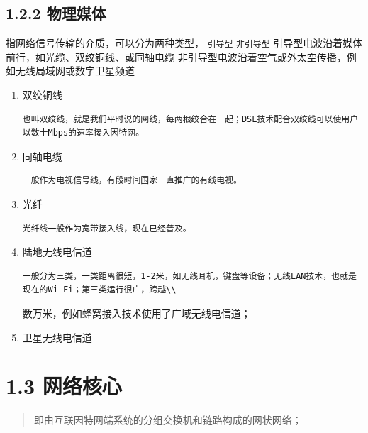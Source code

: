 \documentclass[11pt]{article}
\begin{document}
\subsection{1.2.2 物理媒体}
\label{sec:orgc332708}
指网络信号传输的介质，可以分为两种类型， \texttt{引导型}  \texttt{非引导型}
引导型电波沿着媒体前行，如光缆、双绞铜线、或同轴电缆
非引导型电波沿着空气或外太空传播，例如无线局域网或数字卫星频道
\begin{enumerate}
\item 双绞铜线
\begin{verbatim}
也叫双绞线，就是我们平时说的网线，每两根绞合在一起；DSL技术配合双绞线可以使用户以数十Mbps的速率接入因特网。
\end{verbatim}
\item 同轴电缆
\begin{verbatim}
一般作为电视信号线，有段时间国家一直推广的有线电视。
\end{verbatim}
\item 光纤
\begin{verbatim}
光纤线一般作为宽带接入线，现在已经普及。
\end{verbatim}
\item 陆地无线电信道
\begin{verbatim}
一般分为三类，一类距离很短，1-2米，如无线耳机，键盘等设备；无线LAN技术，也就是现在的Wi-Fi；第三类运行很广，跨越\\
\end{verbatim}

数万米，例如蜂窝接入技术使用了广域无线电信道；
\item 卫星无线电信道
\end{enumerate}


\section{1.3 网络核心}
\label{sec:org119b263}
\begin{quote}
即由互联因特网端系统的分组交换机和链路构成的网状网络；
\end{quote}
\end{document}
